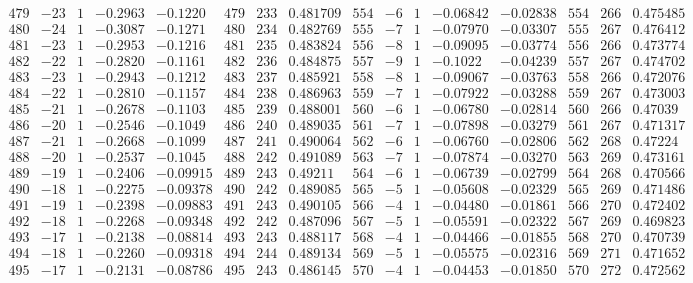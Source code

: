 \documentclass[11pt,reqno,a4letter]{article}
\numberwithin{figure}{section}
\numberwithin{table}{section}
\theoremstyle{plain}
\numberwithin{theorem}{section}
\theoremstyle{definition}
\begin{document}
\begin{table}[ht]
\begin{equation*}
{\begin{array}{ccccc|ccc|ccccc|ccc}
 479 & -23 & 1 & -0.2963 & -0.1220 & 479 & 233 & 0.481709 & 554 & -6 & 1 & -0.06842 & -0.02838 & 554 & 266 & 0.475485 \\
 480 & -24 & 1 & -0.3087 & -0.1271 & 480 & 234 & 0.482769 & 555 & -7 & 1 & -0.07970 & -0.03307 & 555 & 267 & 0.476412 \\
 481 & -23 & 1 & -0.2953 & -0.1216 & 481 & 235 & 0.483824 & 556 & -8 & 1 & -0.09095 & -0.03774 & 556 & 266 & 0.473774 \\
 482 & -22 & 1 & -0.2820 & -0.1161 & 482 & 236 & 0.484875 & 557 & -9 & 1 & -0.1022 & -0.04239 & 557 & 267 & 0.474702 \\
 483 & -23 & 1 & -0.2943 & -0.1212 & 483 & 237 & 0.485921 & 558 & -8 & 1 & -0.09067 & -0.03763 & 558 & 266 & 0.472076 \\
 484 & -22 & 1 & -0.2810 & -0.1157 & 484 & 238 & 0.486963 & 559 & -7 & 1 & -0.07922 & -0.03288 & 559 & 267 & 0.473003 \\
 485 & -21 & 1 & -0.2678 & -0.1103 & 485 & 239 & 0.488001 & 560 & -6 & 1 & -0.06780 & -0.02814 & 560 & 266 & 0.47039 \\
 486 & -20 & 1 & -0.2546 & -0.1049 & 486 & 240 & 0.489035 & 561 & -7 & 1 & -0.07898 & -0.03279 & 561 & 267 & 0.471317 \\
 487 & -21 & 1 & -0.2668 & -0.1099 & 487 & 241 & 0.490064 & 562 & -6 & 1 & -0.06760 & -0.02806 & 562 & 268 & 0.47224 \\
 488 & -20 & 1 & -0.2537 & -0.1045 & 488 & 242 & 0.491089 & 563 & -7 & 1 & -0.07874 & -0.03270 & 563 & 269 & 0.473161 \\
 489 & -19 & 1 & -0.2406 & -0.09915 & 489 & 243 & 0.49211 & 564 & -6 & 1 & -0.06739 & -0.02799 & 564 & 268 & 0.470566 \\
 490 & -18 & 1 & -0.2275 & -0.09378 & 490 & 242 & 0.489085 & 565 & -5 & 1 & -0.05608 & -0.02329 & 565 & 269 & 0.471486 \\
 491 & -19 & 1 & -0.2398 & -0.09883 & 491 & 243 & 0.490105 & 566 & -4 & 1 & -0.04480 & -0.01861 & 566 & 270 & 0.472402 \\
 492 & -18 & 1 & -0.2268 & -0.09348 & 492 & 242 & 0.487096 & 567 & -5 & 1 & -0.05591 & -0.02322 & 567 & 269 & 0.469823 \\
 493 & -17 & 1 & -0.2138 & -0.08814 & 493 & 243 & 0.488117 & 568 & -4 & 1 & -0.04466 & -0.01855 & 568 & 270 & 0.470739 \\
 494 & -18 & 1 & -0.2260 & -0.09318 & 494 & 244 & 0.489134 & 569 & -5 & 1 & -0.05575 & -0.02316 & 569 & 271 & 0.471652 \\
 495 & -17 & 1 & -0.2131 & -0.08786 & 495 & 243 & 0.486145 & 570 & -4 & 1 & -0.04453 & -0.01850 & 570 & 272 & 0.472562 \\

\end{array}}
\end{equation*}
\end{table}
\end{document}
